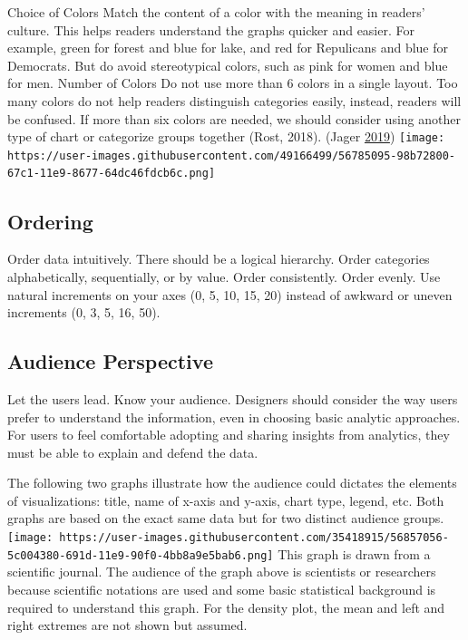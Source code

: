 \documentclass[]{book}
\begin{document}
Choice of Colors \textbar{} Match the content of a color with the meaning in readers' culture. \textbar{} This helps readers understand the graphs quicker and easier. For example, green for forest and blue for lake, and red for Repulicans and blue for Democrats. But do avoid stereotypical colors, such as pink for women and blue for men. \textbar{}
Number of Colors \textbar{} Do not use more than 6 colors in a single layout. \textbar{} Too many colors do not help readers distinguish categories easily, instead, readers will be confused. If more than six colors are needed, we should consider using another type of chart or categorize groups together (Rost, 2018). \textbar{}
(Jager \protect\hyperlink{ref-Tom}{2019})
\texttt{[image: https://user-images.githubusercontent.com/49166499/56785095-98b72800-67c1-11e9-8677-64dc46fdcb6c.png]}

\hypertarget{ordering}{%
\subsection{Ordering}\label{ordering}}

Order data intuitively. There should be a logical hierarchy. Order categories alphabetically, sequentially, or by value. Order consistently. Order evenly. Use natural increments on your axes (0, 5, 10, 15, 20) instead of awkward or uneven increments (0, 3, 5, 16, 50).

\hypertarget{audience-perspective}{%
\subsection{Audience Perspective}\label{audience-perspective}}

Let the users lead. Know your audience. Designers should consider the way users prefer to understand the information, even in choosing basic analytic approaches. For users to feel comfortable adopting and sharing insights from analytics, they must be able to explain and defend the data.

The following two graphs illustrate how the audience could dictates the elements of visualizations: title, name of x-axis and y-axis, chart type, legend, etc. Both graphs are based on the exact same data but for two distinct audience groups.
\texttt{[image: https://user-images.githubusercontent.com/35418915/56857056-5c004380-691d-11e9-90f0-4bb8a9e5bab6.png]}
This graph is drawn from a scientific journal. The audience of the graph above is scientists or researchers because scientific notations are used and some basic statistical background is required to understand this graph. For the density plot, the mean and left and right extremes are not shown but assumed.
\end{document}
